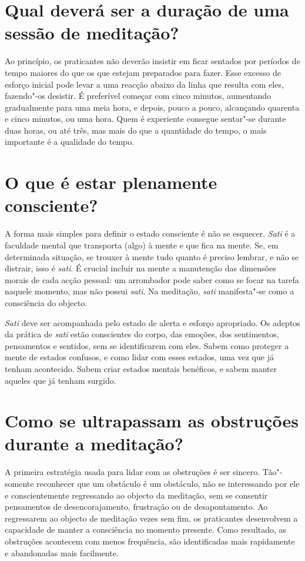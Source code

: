 \section{Qual deverá ser a duração de uma sessão de meditação?}

Ao princípio, os praticantes não deverão insistir em ficar sentados por
períodos de tempo maiores do que os que estejam preparados para fazer.
Esse excesso de esforço inicial pode levar a uma reacção abaixo da linha
que resulta com eles, fazendo"-os desistir. É preferível começar com
cinco minutos, aumentando gradualmente para uma meia hora, e depois,
pouco a pouco, alcançando quarenta e cinco minutos, ou uma hora. Quem é
experiente consegue sentar"-se durante duas horas, ou até três, mas mais
do que a quantidade do tempo, o mais importante é a qualidade do tempo.

\section{O que é estar plenamente consciente?}

A forma mais simples para definir o estado consciente é não se
esquecer. \emph{Sati} é a faculdade mental que transporta (algo) à mente
e que fica na mente. Se, em determinada situação, se trouxer à mente
tudo quanto é preciso lembrar, e não se distrair, isso é \emph{sati}. É
crucial incluir na mente a manutenção das dimensões morais de cada
acção pessoal: um arrombador pode saber como se focar na tarefa naquele
momento, mas não possui \emph{sati}. Na meditação, \emph{sati}
manifesta"-se como a consciência do objecto.

\emph{Sati} deve ser acompanhada pelo estado de alerta e esforço
apropriado. Os adeptos da prática de \emph{sati} estão conscientes do
corpo, das emoções, dos sentimentos, pensamentos e sentidos, sem se
identificarem com eles. Sabem como proteger a mente de estados confusos,
e como lidar com esses estados, uma vez que já tenham acontecido. Sabem
criar estados mentais benéficos, e sabem manter aqueles que já tenham
surgido.

\section{Como se ultrapassam as obstruções durante a meditação?}

A primeira estratégia usada para lidar com as obstruções é ser sincero.
Tão"-somente reconhecer que um obstáculo é um obstáculo, não se
interessando por ele e conscientemente regressando ao objecto da
meditação, sem se consentir pensamentos de desencorajamento, frustração
ou de desapontamento. Ao regressarem ao objecto de meditação vezes sem
fim, os praticantes desenvolvem a capacidade de manter a consciência no
momento presente. Como resultado, as obstruções acontecem com menos
frequência, são identificadas mais rapidamente e abandonadas mais
facilmente.

